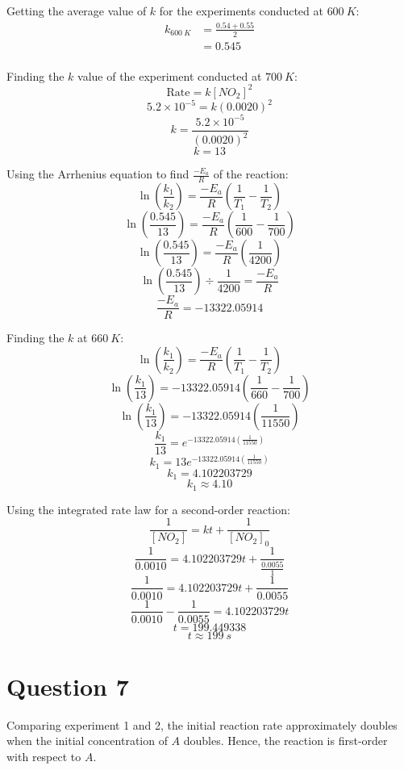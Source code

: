 \documentclass[11pt]{article}
\begin{document}
Getting the average value of \(k\) for the experiments conducted at \(\qty{600}{\unit{K}}\):
\begin{align*}
k_{\qty{600}{\unit{K}}} &= \frac{0.54 + 0.55}{2} \\
&= 0.545 \\
\end{align*}

Finding the \(k\) value of the experiment conducted at \(\qty{700}{\unit{K}}\):
\[\text{Rate} = k[NO_2]^2\]
\[5.2 \times 10^{-5} = k(0.0020)^2\]
\[k = \frac{5.2 \times 10^{-5}}{(0.0020)^2}\]
\[k = 13\]

Using the Arrhenius equation to find \(\frac{-E_a}{R}\) of the reaction:
\[\ln \left( \frac{k_1}{k_2} \right) = \frac{-E_a}{R} \left( \frac{1}{T_1} - \frac{1}{T_2}\right)\]
\[\ln \left( \frac{0.545}{13} \right) = \frac{-E_a}{R} \left( \frac{1}{600} - \frac{1}{700}\right)\]
\[\ln \left( \frac{0.545}{13} \right) = \frac{-E_a}{R} \left( \frac{1}{4200} \right)\]
\[\ln \left( \frac{0.545}{13} \right) \div \frac{1}{4200} = \frac{-E_a}{R}\]
\[\frac{-E_a}{R} = -13322.05914\]

\newpage

Finding the \(k\) at \(\qty{660}{\unit{K}}\):
\[\ln \left( \frac{k_1}{k_2} \right) = \frac{-E_a}{R} \left( \frac{1}{T_1} - \frac{1}{T_2}\right)\]
\[\ln \left( \frac{k_1}{13} \right) = -13322.05914 \left( \frac{1}{660} - \frac{1}{700}\right)\]
\[\ln \left( \frac{k_1}{13} \right) = -13322.05914 \left( \frac{1}{11550} \right)\]
\[\frac{k_1}{13} = e^{-13322.05914 \left( \frac{1}{11550} \right)}\]
\[k_1 = 13e^{-13322.05914 \left( \frac{1}{11550} \right)}\]
\[k_1 = 4.102203729\]
\[k_1 \approx 4.10\]

Using the integrated rate law for a second-order reaction:
\[\frac{1}{[NO_2]} = kt + \frac{1}{[NO_2]_0}\]
\[\frac{1}{0.0010} = 4.102203729t + \frac{1}{\frac{0.0055}{1}}\]
\[\frac{1}{0.0010} = 4.102203729t + \frac{1}{0.0055}\]
\[\frac{1}{0.0010} - \frac{1}{0.0055} = 4.102203729t\]
\[t = 199.449338\]
\[t \approx \qty{199}{\unit{s}}\]

\newpage

\section{Question 7}
\label{sec:org62c2205}

Comparing experiment 1 and 2, the initial reaction rate approximately doubles when the initial concentration of \(A\) doubles. Hence, the reaction is first-order with respect to \(A\).
\\[0pt]
\end{document}
